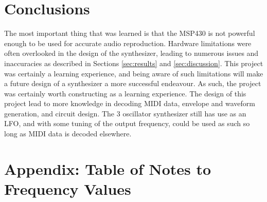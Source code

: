 \documentclass[12pt]{article}
\begin{document}
\section{Conclusions}\label{sec:conclusions}


The most important thing that was learned is that the MSP430 is not powerful enough to be used for accurate audio reproduction. Hardware limitations were often overlooked in the design of the synthesizer, leading to numerous issues and inaccuracies as described in Sections \ref{sec:results} and \ref{sec:discussion}. This project was certainly a learning experience, and being aware of such limitations will make a future design of a synthesizer a more successful endeavour. As such, the project was certainly worth constructing as a learning experience. The design of this project lead to more knowledge in decoding MIDI data, envelope and waveform generation, and circuit design. The 3 oscillator synthesizer still has use as an LFO, and with some tuning of the output frequency, could be used as such so long as MIDI data is decoded elsewhere. 







\break

\appendix

\section{Appendix: Table of Notes to Frequency Values}\label{sec:-table-of-notes-to-frequency-values}



\end{document}

